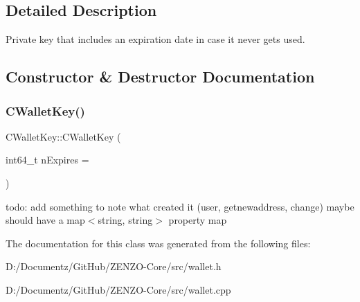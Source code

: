 \subsection{Detailed Description}
Private key that includes an expiration date in case it never gets used. 

\subsection{Constructor \& Destructor Documentation}
\mbox{\label{class_c_wallet_key_aa2603825b543b1d5153f31482139a6b2}} 
\subsubsection{\texorpdfstring{CWalletKey()}{CWalletKey()}}
{\footnotesize\ttfamily C\+Wallet\+Key\+::\+C\+Wallet\+Key (\begin{DoxyParamCaption}\item[{int64\+\_\+t}]{n\+Expires = {} }\end{DoxyParamCaption})}

todo\+: add something to note what created it (user, getnewaddress, change) maybe should have a map$<$string, string$>$ property map 

The documentation for this class was generated from the following files\+:\begin{DoxyCompactItemize}
\item 
D\+:/\+Documentz/\+Git\+Hub/\+Z\+E\+N\+Z\+O-\/\+Core/src/wallet.\+h\item 
D\+:/\+Documentz/\+Git\+Hub/\+Z\+E\+N\+Z\+O-\/\+Core/src/wallet.\+cpp\end{DoxyCompactItemize}
